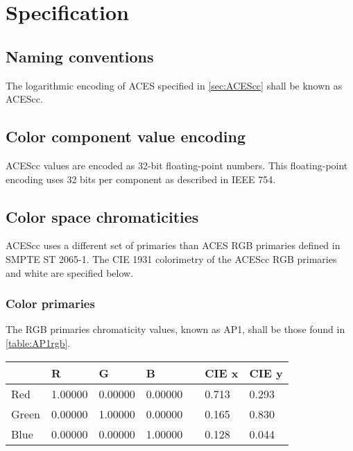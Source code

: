 \regularsectionformat	%
\chapter{Specification}

\section{Naming conventions}
The logarithmic encoding of ACES specified in \autoref{sec:ACEScc} shall be known as ACEScc.

\section{Color component value encoding}
ACEScc values are encoded as 32-bit floating-point numbers. This floating-point encoding uses 32 bits per component as described in IEEE 754.

\section{Color space chromaticities}
\label{sec:colorspace}
ACEScc uses a different set of primaries than ACES RGB primaries defined in SMPTE ST 2065-1. The CIE 1931 colorimetry of the ACEScc RGB primaries and white are specified below.

\subsection{Color primaries}
The RGB primaries chromaticity values, known as AP1, shall be those found in \autoref{table:AP1rgb}.

\begin{center}
\begin{tabularx}{4.5in}{XlllXll}
        & R       & G       & B       & & CIE x & CIE y \\ \hline
Red     & 1.00000 & 0.00000 & 0.00000 & & 0.713 & 0.293 \\
Green   & 0.00000 & 1.00000 & 0.00000 & & 0.165 & 0.830 \\
Blue    & 0.00000 & 0.00000 & 1.00000 & & 0.128 & 0.044 \\
\end{tabularx}
\label{table:AP1rgb}
\end{center}

